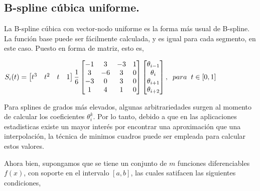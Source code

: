 \subsection{B-spline c\'ubica uniforme.\\}

\hspace{0.4cm} La B-spline c\'ubica con vector-nodo uniforme es la forma m\'as usual de B-spline. La funci\'on base puede ser f\'acilmente calculada, y es igual para cada segmento, en este caso. Puesto en forma de matriz, esto es,

\vspace{0.2cm}

\begin{center}
$\displaystyle{S_{i}(t) = \begin{bmatrix} t^3  & t^2 & t & 1  \end{bmatrix} \frac{1}{6} \begin{bmatrix} -1 & 3 & -3 & 1 \\ 3 & -6 & 3 & 0 \\ -3 & 0 & 3 & 0 \\ 1 & 4 & 1 & 0 \end{bmatrix} \begin{bmatrix}  \theta_{i-1} \\ \theta_{i} \\ \theta_{i+1} \\ \theta_{i+2}  \end{bmatrix} , \hspace{0.2cm} para \hspace{0.2cm} t \in [0,1] }$
\end{center}

\vspace{0.2cm}

\hspace{0.4cm}Para splines de grados m\'as elevados, algunas arbitrariedades surgen al momento de calcular los coeficientes $\theta_{i}^{k}$. Por lo tanto, debido a que en las aplicaciones estadisticas existe un mayor inter\'es por encontrar una aproximaci\'on que una interpolaci\'on, la t\'ecnica de minimos cuadros puede ser empleada para calcular estos valores.


\hspace{0.4cm} Ahora bien, supongamos que se tiene un conjunto de $m$ funciones diferenciables $f(x)$, con soporte en el intervalo $[a,b]$, las cuales satifacen las siguientes condiciones,


